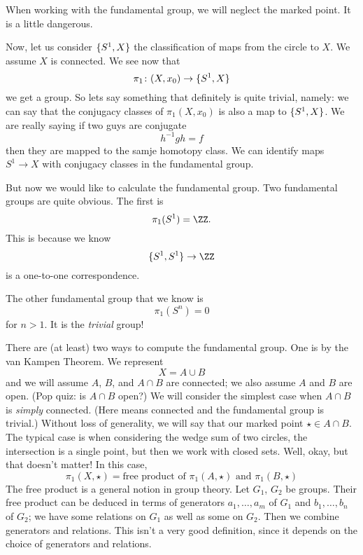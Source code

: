 When working with the fundamental group, we will neglect the
marked point. It is a little dangerous.

Now, let us consider $\homotopyClass(S^1,X)$ the classification
of maps from the circle to $X$. We assume $X$ is connected. We
see now that
\begin{equation}
\pi_1\colon (X,x_0)\to\homotopyClass(S^1,X)
\end{equation}
we get a group. So lets say something that definitely is quite
trivial, namely: we can say that the conjugacy classes of
$\pi_1(X,x_0)$ is also a map to $\homotopyClass(S^1,X)$. We are
really saying if two guys are conjugate
\begin{equation}
h^{-1}gh=f
\end{equation}
then they are mapped to the samje homotopy class. We can identify
maps $S^1\to X$ with conjugacy classes in the fundamental group.

But now we would like to calculate the fundamental group. Two
fundamental groups are quite obvious. The first
is
\begin{equation}
\pi_{1}(S^1)=\ZZ.
\end{equation}
This is because we know
\begin{equation}
\homotopyClass(S^1,S^1)\to\ZZ
\end{equation}
is a one-to-one correspondence. 

The other fundamental group 
that we know is
\begin{equation}
\pi_{1}(S^n)=0
\end{equation}
for $n>1$. It is the \emph{trivial} group!

There are (at least) two ways to compute the fundamental
group. One is by the van Kampen Theorem.
We represent
\begin{equation}
X=A\cup B
\end{equation}
and we will assume $A$, $B$, and $A\cap B$ are connected; we also
assume $A$ and $B$ are open. (Pop quiz: is $A\cap B$ open?) We
will consider the simplest case when $A\cap B$ is \emph{simply}
connected. (Here 
means connected and the fundamental group is trivial.)
Without loss of generality, we will say that our marked point
$\star\in A\cap B$. 
The typical case is when considering the wedge sum of two
circles, the intersection is a single point, but then we work
with closed sets. Well, okay, but that doesn't matter! In this
case,
\begin{equation}
\pi_{1}(X,\star)=\mbox{free product of }\pi_{1}(A,\star)\mbox{ and }\pi_{1}(B,\star)
\end{equation}
The free product
is a general notion in group theory. Let $G_1$, $G_2$ be
groups. Their free product can be deduced in terms of generators
$a_1,\dots,a_m$ of $G_1$ and $b_1,\dots,b_n$ of $G_2$; we have
some relations on $G_1$ as well as some on $G_2$. Then we combine
generators and relations. This isn't a very good definition,
since it depends on the choice of generators and relations.

